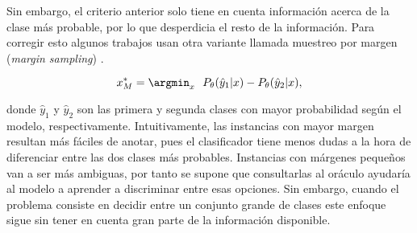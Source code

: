 %
%
%

Sin embargo, el criterio anterior solo tiene en cuenta información acerca de la clase más probable, por lo que desperdicia el resto de la información. Para corregir esto algunos trabajos usan otra variante llamada muestreo por margen (\textit{margin sampling}) \cite{scheffer2001activeHM}.

\begin{equation}
x_{M}^* =  \argmin_x \ \ {P_{\theta}(\hat{y}_1|x) - P_{\theta}(\hat{y}_2|x)},
\end{equation}

donde $\hat{y}_1$ y $\hat{y}_2$  son las primera y segunda clases con mayor probabilidad según el modelo, respectivamente. Intuitivamente, las instancias con mayor margen resultan más fáciles de anotar, pues el clasificador tiene menos dudas a la hora de diferenciar entre las dos clases más probables. Instancias con márgenes pequeños van a ser más ambiguas, por tanto se supone que consultarlas al oráculo ayudaría al modelo a aprender a discriminar entre esas opciones. Sin embargo,  cuando el problema consiste en decidir entre un conjunto grande de clases este enfoque sigue sin tener en cuenta gran parte de la información disponible.

